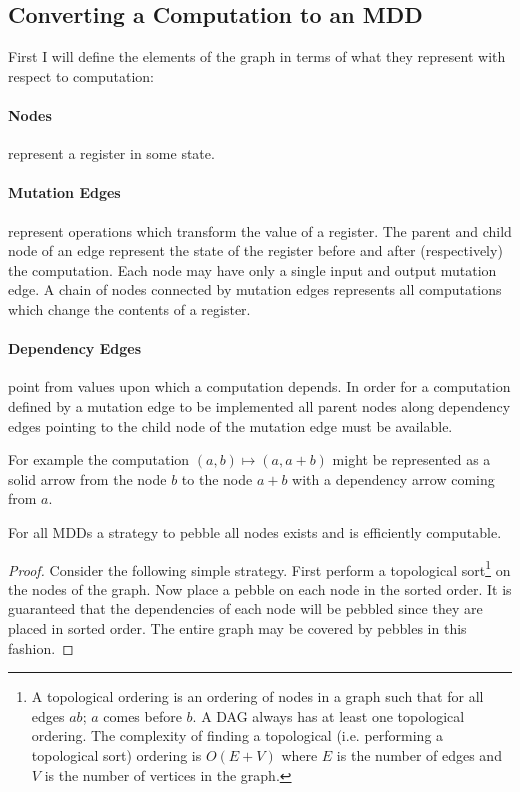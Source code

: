 \subsection{Converting a Computation to an MDD}

First I will define the elements of the graph in terms of what they represent
with respect to computation:

\paragraph{Nodes} represent a register in some state.

\paragraph{Mutation Edges} represent operations which transform the value
of a register. The parent and child node of an edge represent the state of the
register before and after (respectively) the computation. Each node may have
only a single input and output mutation edge. A chain of nodes connected by
mutation edges represents all computations which change the contents of a
register.

\paragraph{Dependency Edges} point from values upon which a computation
depends. In order for a computation defined by a mutation edge to be implemented
all parent nodes along dependency edges pointing to the child node of the
mutation edge must be available.

For example the computation $(a,b)\mapsto(a,a+b)$ might be represented as a
solid arrow from the node $b$ to the node $a+b$ with a dependency arrow coming
from $a$.


\begin{theorem} For all MDDs a strategy to pebble all nodes exists and is
efficiently computable. \end{theorem}

\begin{proof} Consider the following simple strategy. First perform a
topological sort\footnote{A topological ordering is an ordering of nodes in
a graph such that for all edges $ab$; $a$ comes before $b$. A DAG
always has at least one topological ordering. The complexity of finding
a topological (i.e. performing a topological sort) ordering is $O(E+V)$
where $E$ is the number of edges and $V$ is the number of vertices in the
graph.} on the nodes of the graph. Now place a pebble on each node in the
sorted order. It is guaranteed that the dependencies of each node will be
pebbled since they are placed in sorted order. The entire graph may be covered
by pebbles in this fashion.\end{proof}


